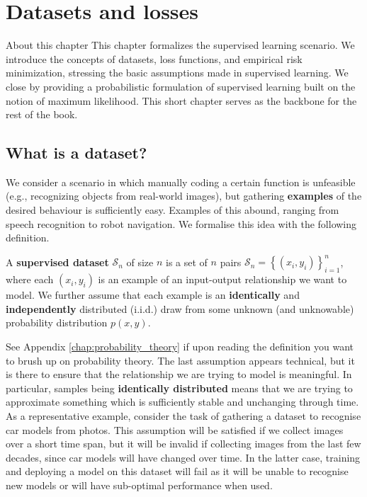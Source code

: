 \chapter{Datasets and losses}
\label{chap:supervised_learning}

\begin{supportbox}{About this chapter}
This chapter formalizes the supervised learning scenario. We introduce the concepts of datasets, loss functions, and empirical risk minimization, stressing the basic assumptions made in supervised learning. We close by providing a probabilistic formulation of supervised learning built on the notion of maximum likelihood. This short chapter serves as the backbone for the rest of the book.
\end{supportbox}

\section{What is a dataset?}
\label{sec:dataset}

We consider a scenario in which manually coding a certain function is unfeasible (e.g., recognizing objects from real-world images), but gathering \textbf{examples} of the desired behaviour is sufficiently easy. Examples of this abound, ranging from speech recognition to robot navigation. We formalise this idea with the following definition.

\begin{definition}[Dataset] \addbottle
A \textbf{supervised dataset} $\mathcal{S}_n$ of size $n$ is a set of $n$ pairs $\mathcal{S}_n = \left\{(x_i, y_i)\right\}_{i=1}^n$, where each $(x_i, y_i)$ is an example of an input-output relationship we want to model. We further assume that each example is an \textbf{identically} and \textbf{independently} distributed (i.i.d.) draw from some unknown (and unknowable) probability distribution $p(x,y)$.
\end{definition}

See Appendix \ref{chap:probability_theory} if upon reading the definition you want to brush up on probability theory. The last assumption appears technical, but it is there to ensure that the relationship we are trying to model is meaningful. In particular, samples being \textbf{identically distributed} means that we are trying to approximate something which is sufficiently stable and unchanging through time. As a representative example, consider the task of gathering a dataset to recognise car models from photos. This assumption will be satisfied if we collect images over a short time span, but it will be invalid if collecting images from the last few decades, since car models will have changed over time. In the latter case, training and deploying a model on this dataset will fail as it will be unable to recognise new models or will have sub-optimal performance when used.


